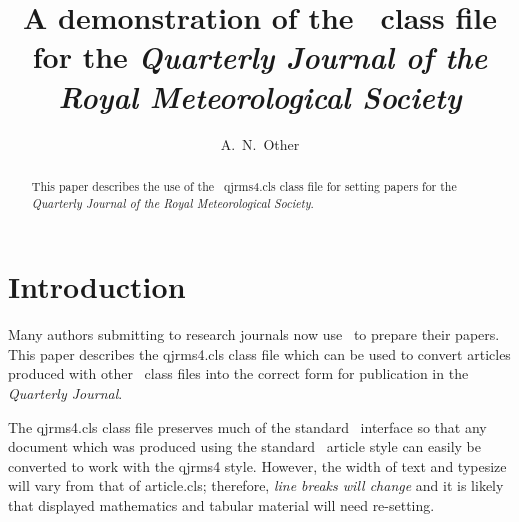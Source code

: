 \documentclass[times]{qjrms4}
\begin{document}

\title{A demonstration of the \LaTeXe\ class file for
the \itshape{Quarterly Journal of the Royal Meteorological
Society}\footnotemark[2]}

\author{A.~N.~Other\corrauth}

\address{John Wiley \& Sons, Ltd, The Atrium, Southern Gate, Chichester,
West Sussex, PO19~8SQ, UK}


\begin{abstract}
This paper describes the use of the \LaTeXe\ \textsf{qjrms4.cls}
class file for setting papers for the \emph{Quarterly Journal of
the Royal Meteorological Society}.
\end{abstract}


\maketitle


\section{Introduction} Many authors submitting to research journals
now use \LaTeXe\ to prepare their papers. This paper describes the
\textsf{qjrms4.cls} class file which can be used to convert
articles produced with other \LaTeXe\ class files into the correct
form for publication in the \emph{Quarterly Journal}.

The \textsf{qjrms4.cls} class file preserves much of the standard
\LaTeXe\ interface so that any document which was produced using
the standard \LaTeXe\ \textsf{article} style can easily be
converted to work with the \textsf{qjrms4} style. However, the
width of text and typesize will vary from that of
\textsf{article.cls}; therefore, \emph{line breaks will change}
and it is likely that displayed mathematics and tabular material
will need re-setting.
\end{document}
